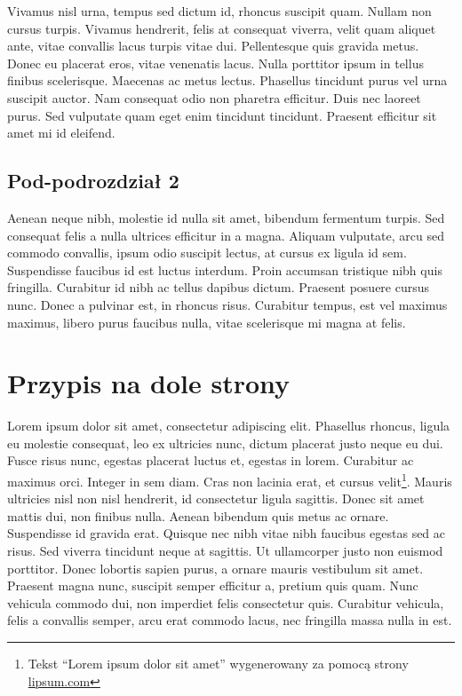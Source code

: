 Vivamus nisl urna, tempus sed dictum id, rhoncus\cite{knuthwebsite} suscipit quam. Nullam non cursus turpis. Vivamus hendrerit, felis at consequat viverra, velit quam aliquet ante, vitae convallis lacus turpis vitae dui. Pellentesque quis gravida metus. Donec eu placerat eros, vitae venenatis lacus. Nulla porttitor ipsum in tellus finibus scelerisque. Maecenas ac metus lectus. Phasellus tincidunt purus vel urna suscipit auctor. Nam consequat odio non pharetra efficitur. Duis nec laoreet purus. Sed vulputate quam eget enim tincidunt tincidunt. Praesent efficitur sit amet mi id eleifend.

\subsection*{Pod-podrozdział 2}
Aenean neque nibh, molestie id nulla sit amet, bibendum fermentum turpis. Sed consequat felis a nulla ultrices efficitur in a magna. Aliquam vulputate, arcu sed commodo convallis, ipsum odio suscipit lectus, at cursus ex ligula id sem. Suspendisse faucibus id est luctus interdum\cite{knuth-fa}. Proin accumsan tristique nibh quis fringilla. Curabitur id nibh ac tellus dapibus dictum. Praesent posuere cursus nunc. Donec a pulvinar est, in rhoncus risus. Curabitur tempus, est vel maximus maximus, libero purus faucibus nulla, vitae scelerisque mi magna at felis.


\section{Przypis na dole strony}
Lorem ipsum dolor sit amet, consectetur adipiscing elit. Phasellus rhoncus, ligula eu molestie consequat, leo ex ultricies nunc, dictum placerat justo neque eu dui. Fusce risus nunc, egestas placerat luctus et, egestas in lorem. Curabitur ac maximus orci. Integer in sem diam. Cras non lacinia erat, et cursus velit\footnote{Tekst \enquote{Lorem ipsum dolor sit amet} wygenerowany za pomocą strony \href{https://www.lipsum.com}{lipsum.com}}. Mauris ultricies nisl non nisl hendrerit, id consectetur ligula sagittis. Donec sit amet mattis dui, non finibus nulla. Aenean bibendum quis metus ac ornare. Suspendisse id gravida erat. Quisque nec nibh vitae nibh faucibus egestas sed ac risus. Sed viverra tincidunt neque at sagittis. Ut ullamcorper justo non euismod porttitor. Donec lobortis sapien purus, a ornare mauris vestibulum sit amet. Praesent magna nunc, suscipit semper efficitur a, pretium quis quam. Nunc vehicula commodo dui, non imperdiet felis consectetur quis. Curabitur vehicula, felis a convallis semper, arcu erat commodo lacus, nec fringilla massa nulla in est.
